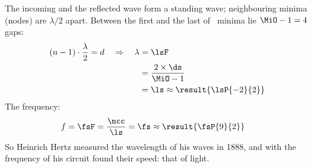 The incoming and the reflected wave form a standing wave; neighbouring minima (nodes) are $\lambda/2$ apart. Between the first and the last of \MiO\ minima lie $\MiO - 1 = 4$ gaps:
\begin{align}
 (n-1)\cdot\frac{\lambda}{2} = d \quad\Rightarrow\quad \lambda &= \lsF \\
   &= \frac{2\times\ds}{\MiO-1} \\
   &= \ls \approx \result{\lsP{-2}{2}}
\end{align}
The frequency:
\begin{align}
 f &= \fsF = \frac{\ncc}{\ls} = \fs \approx \result{\fsP{9}{2}}
\end{align}
So Heinrich Hertz measured the wavelength of his waves in 1888, and with the frequency of his circuit found their speed: that of light.
